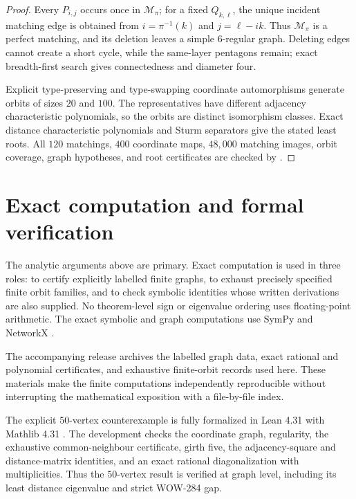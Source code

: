\documentclass[a4paper,10pt,reqno]{amsart}
\theoremstyle{plain}
\theoremstyle{definition}
\theoremstyle{remark}
\newcommand{\RepoTag}{v2.3.0}
\newcommand{\codefile}[1]{%
  \href{https://github.com/SamPetkov/wow284/blob/\RepoTag/#1}{\path{#1}}}
\begin{document}
\begin{proof}
Every \(P_{i,j}\) occurs once in \(\mathcal M_\pi\); for a fixed
\(Q_{k,\ell}\), the unique incident matching edge is obtained from
\(i=\pi^{-1}(k)\) and \(j=\ell-ik\).  Thus \(\mathcal M_\pi\) is a
perfect matching, and its deletion leaves a simple \(6\)-regular graph.
Deleting edges cannot create a short cycle, while the same-layer pentagons
remain; exact breadth-first search gives connectedness and diameter four.

Explicit type-preserving and type-swapping coordinate automorphisms generate
orbits of sizes \(20\) and \(100\).  The representatives have different
adjacency characteristic polynomials, so the orbits are distinct isomorphism
classes.  Exact distance characteristic polynomials and Sturm separators give
the stated least roots.  All \(120\) matchings, \(400\) coordinate maps,
\(48{,}000\) matching images, orbit coverage, graph hypotheses, and root
certificates are checked
by \codefile{scripts/verify_proof_audit_07_layer_matchings.py}.
\end{proof}

\section{Exact computation and formal verification}\label{sec:verification}

The analytic arguments above are primary.  Exact computation is used in three
roles: to certify explicitly labelled finite graphs, to exhaust precisely
specified finite orbit families, and to check symbolic identities whose
written derivations are also supplied.  No theorem-level sign or eigenvalue
ordering uses floating-point arithmetic.  The exact symbolic and graph
computations use SymPy and NetworkX \cite{MeurerEtAl2017,HagbergSchultSwart2008}.

The accompanying release archives the labelled graph data, exact rational
and polynomial certificates, and exhaustive finite-orbit records used here.
These materials make the finite computations independently reproducible
without interrupting the mathematical exposition with a file-by-file index.

The explicit \(50\)-vertex counterexample is fully formalized in Lean 4.31
with Mathlib 4.31 \cite{deMouraUllrich2021,Mathlib2020}.  The development
checks the coordinate graph, regularity, the exhaustive common-neighbour
certificate, girth five, the adjacency-square and distance-matrix identities,
and an exact rational diagonalization with multiplicities.  Thus the
\(50\)-vertex result is verified at graph level, including its least distance
eigenvalue and strict WOW-284 gap.
\end{document}

